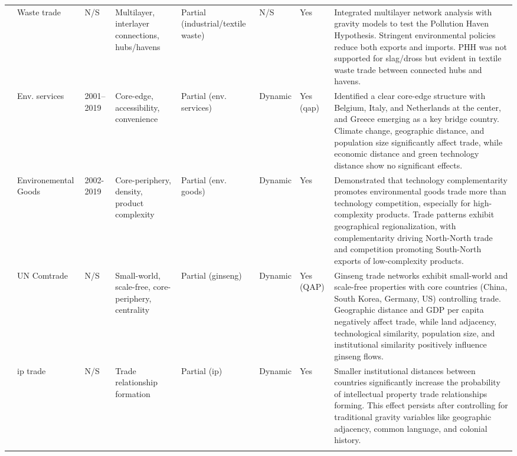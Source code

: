 \documentclass[preprint, 3p,
authoryear]{elsarticle} %
\begin{document}
\begin{landscape}
\begin{longtable}{p{2.2cm}p{2cm}p{1.5cm}p{3.0cm}p{1.8cm}p{1.2cm}p{1.2cm}p{8cm}}
\cite{poon2024industrial} & Waste trade & N/S & Multilayer, interlayer connections, hubs/havens & Partial (industrial/textile waste) & N/S & Yes & Integrated multilayer network analysis with gravity models to test the Pollution Haven Hypothesis. Stringent environmental policies reduce both exports and imports. PHH was not supported for slag/dross but evident in textile waste trade between connected hubs and havens. \\
\addlinespace

\cite{jiang2023structural} & Env. services & 2001–2019 & Core-edge, accessibility, convenience & Partial (env. services) & Dynamic & Yes (\gls{qap}) & Identified a clear core-edge structure with Belgium, Italy, and Netherlands at the center, and Greece emerging as a key bridge country. Climate change, geographic distance, and population size significantly affect trade, while economic distance and green technology distance show no significant effects. \\
\addlinespace

\cite{he2024symphony} & Environemental Goods & 2002-2019 & Core-periphery, density, product complexity & Partial (env. goods) & Dynamic & Yes & Demonstrated that technology complementarity promotes environmental goods trade more than technology competition, especially for high-complexity products. Trade patterns exhibit geographical regionalization, with complementarity driving North-North trade and competition promoting South-North exports of low-complexity products.   \\
\addlinespace

\cite{fang2023global} & UN Comtrade & N/S & Small-world, scale-free, core-periphery, centrality & Partial (ginseng) & Dynamic & Yes (QAP) & Ginseng trade networks exhibit small-world and scale-free properties with core countries (China, South Korea, Germany, US) controlling trade. Geographic distance and GDP per capita negatively affect trade, while land adjacency, technological similarity, population size, and institutional similarity positively influence ginseng flows. \\
\addlinespace

\cite{wang2025deepening} & \gls{ip} trade & N/S & Trade relationship formation & Partial (\gls{ip}) & Dynamic & Yes & Smaller institutional distances between countries significantly increase the probability of intellectual property trade relationships forming. This effect persists after controlling for traditional gravity variables like geographic adjacency, common language, and colonial history.  \\
\addlinespace


\end{longtable}
\end{landscape}
\end{document}
